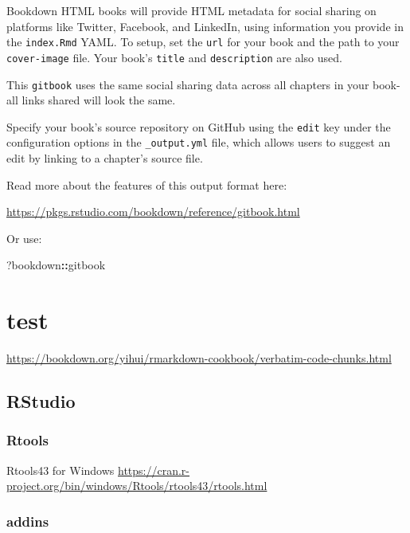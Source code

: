 \documentclass[
]{book}
\newenvironment{Shaded}{\begin{snugshade}}{\end{snugshade}}
\newcommand{\NormalTok}[1]{#1}
\newcommand{\SpecialCharTok}[1]{\textcolor[rgb]{0.81,0.36,0.00}{\textbf{#1}}}
\theoremstyle{definition}
\theoremstyle{definition}
\theoremstyle{definition}
\theoremstyle{definition}
\theoremstyle{remark}
\begin{document}
Bookdown HTML books will provide HTML metadata for social sharing on platforms like Twitter, Facebook, and LinkedIn, using information you provide in the \texttt{index.Rmd} YAML. To setup, set the \texttt{url} for your book and the path to your \texttt{cover-image} file. Your book's \texttt{title} and \texttt{description} are also used.

This \texttt{gitbook} uses the same social sharing data across all chapters in your book- all links shared will look the same.

Specify your book's source repository on GitHub using the \texttt{edit} key under the configuration options in the \texttt{\_output.yml} file, which allows users to suggest an edit by linking to a chapter's source file.

Read more about the features of this output format here:

\url{https://pkgs.rstudio.com/bookdown/reference/gitbook.html}

Or use:

\begin{Shaded}
\begin{Highlighting}[]
\NormalTok{?bookdown}\SpecialCharTok{::}\NormalTok{gitbook}
\end{Highlighting}
\end{Shaded}

\hypertarget{test}{%
\chapter{test}\label{test}}

\url{https://bookdown.org/yihui/rmarkdown-cookbook/verbatim-code-chunks.html}

\hypertarget{rstudio}{%
\section{RStudio}\label{rstudio}}

\hypertarget{rtools}{%
\subsection{Rtools}\label{rtools}}

Rtools43 for Windows
\url{https://cran.r-project.org/bin/windows/Rtools/rtools43/rtools.html}

\hypertarget{addins}{%
\subsection{addins}\label{addins}}
\end{document}
